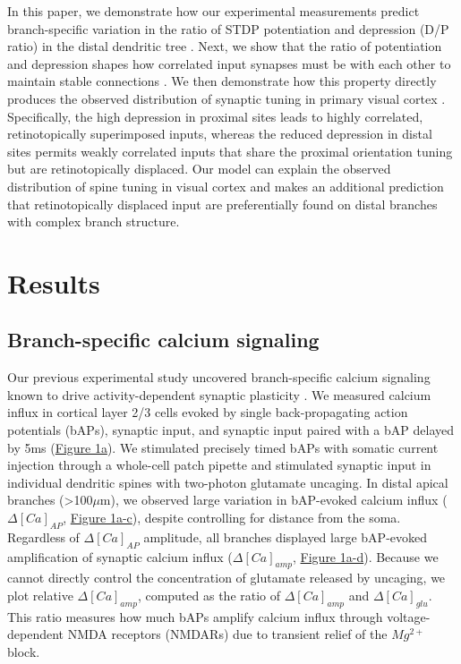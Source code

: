 \documentclass[twocolumn]{theme/bioRxiv}
\begin{document}
In this paper, we demonstrate how our experimental measurements predict branch-specific variation in the ratio of STDP potentiation and depression (D/P ratio) in the distal dendritic tree \citep{nevianSpineCa2Signaling2006}. Next, we show that the ratio of potentiation and depression shapes how correlated input synapses must be with each other to maintain stable connections \citep{songCompetitiveHebbianLearning2000}. We then demonstrate how this property directly produces the observed distribution of synaptic tuning in primary visual cortex \citep{iacarusoSynapticOrganizationVisual2017}. Specifically, the high depression in proximal sites leads to highly correlated, retinotopically superimposed inputs, whereas the reduced depression in distal sites permits weakly correlated inputs that share the proximal orientation tuning but are retinotopically displaced. Our model can explain the observed distribution of spine tuning in visual cortex and makes an additional prediction that retinotopically displaced input are preferentially found on distal branches with complex branch structure.


\section*{Results}\label{s:results}

\subsection*{Branch-specific calcium signaling}
Our previous experimental study uncovered branch-specific calcium signaling known to drive activity-dependent synaptic plasticity \citep{landauDendriticBranchStructure2022, nevianSpineCa2Signaling2006}. We measured calcium influx in cortical layer 2/3 cells evoked by single back-propagating action potentials (bAPs), synaptic input, and synaptic input paired with a bAP delayed by 5ms (\hyperref[fig:1]{Figure 1a}). We stimulated precisely timed bAPs with somatic current injection through a whole-cell patch pipette and stimulated synaptic input in individual dendritic spines with two-photon glutamate uncaging. In distal apical branches (>100$\mu$m), we observed large variation in bAP-evoked calcium influx ($\Delta[Ca]_{AP}$, \hyperref[fig:1]{Figure 1a-c}), despite controlling for distance from the soma. Regardless of $\Delta[Ca]_{AP}$ amplitude, all branches displayed large bAP-evoked amplification of synaptic calcium influx ($\Delta[Ca]_{amp}$, \hyperref[fig:1]{Figure 1a-d}). Because we cannot directly control the concentration of glutamate released by uncaging, we plot relative $\Delta[Ca]_{amp}$, computed as the ratio of $\Delta[Ca]_{amp}$ and $\Delta[Ca]_{glu}$. This ratio measures how much bAPs amplify calcium influx through voltage-dependent NMDA receptors (NMDARs) due to transient relief of the $Mg^{2+}$ block. 
\end{document}
